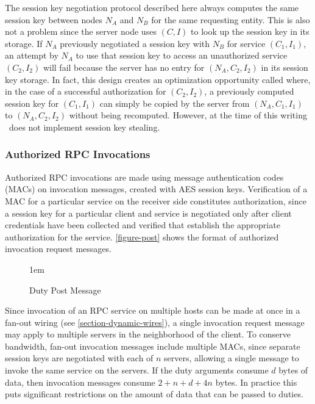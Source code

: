 The session key negotiation protocol described here always computes the same session key between
nodes $N_A$ and $N_B$ for the same requesting entity. This is also not a problem since the
server node uses $(C, I)$ to look up the session key in its storage. If $N_A$ previously
negotiated a session key with $N_B$ for service $(C_1, I_1)$, an attempt by $N_A$ to use that
session key to access an unauthorized service $(C_2, I_2)$ will fail because the server has no
entry for $(N_A, C_2, I_2)$ in its session key storage. In fact, this design creates an
optimization opportunity called  where, in the case of a
successful authorization for $(C_2, I_2)$, a previously computed session key for $(C_1, I_1)$
can simply be copied by the server from $(N_A, C_1, I_1)$ to $(N_A, C_2, I_2)$ without being
recomputed. However, at the time of this writing \Sprocket\ does not implement session key
stealing.

\subsubsection{Authorized RPC Invocations}

Authorized RPC invocations are made using message authentication codes (MACs) on invocation
messages, created with AES session keys. Verification of a MAC for a particular service on the
receiver side constitutes authorization, since a session key for a particular client and service
is negotiated only after client credentials have been collected and verified that establish the
appropriate authorization for the service. \autoref{figure-post} shows the format of authorized
invocation request messages.

\begin{figure}[t]
  
  \centerline{\raise 1em\box\graph}
  \caption{Duty Post Message}
  \label{figure-post}
\end{figure}

Since invocation of an RPC service on multiple hosts can be made at once in a fan-out wiring
(see \autoref{section-dynamic-wires}), a single invocation request message may apply to multiple
servers in the neighborhood of the client. To conserve bandwidth, fan-out invocation messages
include multiple MACs, since separate session keys are negotiated with each of $n$ servers,
allowing a single message to invoke the same service on the servers. If the duty arguments
consume $d$ bytes of data, then invocation messages consume $2 + n + d + 4n$ bytes. In practice
this puts significant restrictions on the amount of data that can be passed to duties.

